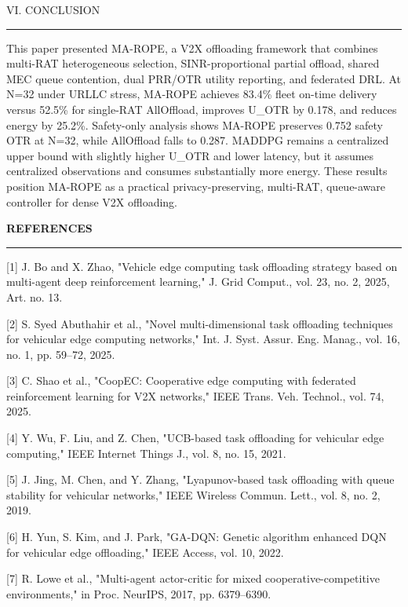 \documentclass[journal,10pt,twocolumn]{IEEEtran}
\begin{document}
VI. CONCLUSION

\begin{center}\rule{0.5\linewidth}{0.5pt}\end{center}

This paper presented MA-ROPE, a V2X offloading framework that combines
multi-RAT heterogeneous selection, SINR-proportional partial offload,
shared MEC queue contention, dual PRR/OTR utility reporting, and
federated DRL. At N=32 under URLLC stress, MA-ROPE achieves 83.4\% fleet
on-time delivery versus 52.5\% for single-RAT AllOffload, improves
U\_OTR by 0.178, and reduces energy by 25.2\%. Safety-only analysis
shows MA-ROPE preserves 0.752 safety OTR at N=32, while AllOffload falls
to 0.287. MADDPG remains a centralized upper bound with slightly higher
U\_OTR and lower latency, but it assumes centralized observations and
consumes substantially more energy. These results position MA-ROPE as a
practical privacy-preserving, multi-RAT, queue-aware controller for
dense V2X offloading.

\textbf{REFERENCES}

\begin{center}\rule{0.5\linewidth}{0.5pt}\end{center}

{[}1{]} J. Bo and X. Zhao, "Vehicle edge computing task offloading
strategy based on multi-agent deep reinforcement learning," J. Grid
Comput., vol. 23, no. 2, 2025, Art. no. 13.

{[}2{]} S. Syed Abuthahir et al., "Novel multi-dimensional task
offloading techniques for vehicular edge computing networks," Int. J.
Syst. Assur. Eng. Manag., vol. 16, no. 1, pp. 59--72, 2025.

{[}3{]} C. Shao et al., "CoopEC: Cooperative edge computing with
federated reinforcement learning for V2X networks," IEEE Trans. Veh.
Technol., vol. 74, 2025.

{[}4{]} Y. Wu, F. Liu, and Z. Chen, "UCB-based task offloading for
vehicular edge computing," IEEE Internet Things J., vol. 8, no. 15,
2021.

{[}5{]} J. Jing, M. Chen, and Y. Zhang, "Lyapunov-based task offloading
with queue stability for vehicular networks," IEEE Wireless Commun.
Lett., vol. 8, no. 2, 2019.

{[}6{]} H. Yun, S. Kim, and J. Park, "GA-DQN: Genetic algorithm enhanced
DQN for vehicular edge offloading," IEEE Access, vol. 10, 2022.

{[}7{]} R. Lowe et al., "Multi-agent actor-critic for mixed
cooperative-competitive environments," in Proc. NeurIPS, 2017, pp.
6379--6390.
\end{document}
